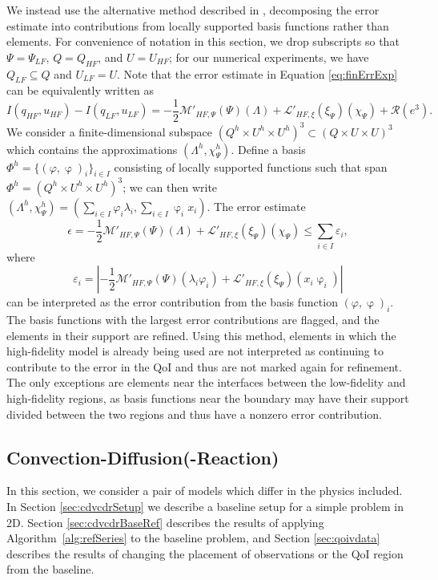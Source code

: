 We instead use the alternative method described in \cite{vanOpstaletal15}, decomposing the error estimate into contributions from locally supported basis functions rather than elements. For convenience of notation in this section, we drop subscripts so that $\Psi=\Psi_{LF}$, $Q=Q_{HF}$, and $U=U_{HF}$; for our numerical experiments, we have $Q_{LF}\subseteq Q$ and $U_{LF}=U$. Note that the error estimate in Equation \ref{eq:finErrExp} can be equivalently written as
%
\begin{equation}
I(q_{HF},u_{HF})-I(q_{LF},u_{LF})=-\frac{1}{2}\mathcal{M}'_{HF,\Psi}(\Psi)(\Lambda)+\mathcal{L}'_{HF,\xi}(\xi_\Psi)(\chi_\Psi)+\mathcal{R}(e^3). \nonumber
\end{equation}
%
We consider a finite-dimensional  subspace $(Q^h\times U^h\times U^h)^3 \subset (Q\times U\times U)^3$ which contains the approximations $(\Lambda^h,\chi_\Psi^h)$. Define a basis $\Phi^h=\{(\varphi,\upvarphi)_i\}_{i\in I}$ consisting of locally supported functions such that span $\Phi^h=(Q^h\times U^h\times U^h)^3$; we can then write $(\Lambda^h,\chi_\Psi^h)=(\sum_{i\in I}\varphi_i\lambda_i,\sum_{i\in I}\upvarphi_i x_i)$. The error estimate
%
\begin{equation}
\epsilon = -\frac{1}{2}\mathcal{M}'_{HF,\Psi}(\Psi)(\Lambda)+\mathcal{L}'_{HF,\xi}(\xi_\Psi)(\chi_\Psi) \leq \sum_{i\in I} \varepsilon_i,
\end{equation}
%
where
%
\begin{equation}\label{eq:basisblame}
\varepsilon_i = \left| -\frac{1}{2}\mathcal{M}'_{HF,\Psi}(\Psi)(\lambda_i\varphi_i)+\mathcal{L}'_{HF,\xi}(\xi_\Psi)(x_i\upvarphi_i) \right|
\end{equation}
%
can be interpreted as the error contribution from the basis function $(\varphi,\upvarphi)_i$. The basis functions with the largest error contributions are flagged, and the elements in their support are refined. Using this method, elements in which the high-fidelity model is already being used are not interpreted as continuing to contribute to the error in the QoI and thus are not marked again for refinement. The only exceptions are elements near the interfaces between the low-fidelity and high-fidelity regions, as basis functions near the boundary may have their support divided between the two regions and thus have a nonzero error contribution. 
%
\subsection{Convection-Diffusion(-Reaction)} \label{sec:cdvcdr}
%
In this section, we consider a pair of models which differ in the physics included. In Section \ref{sec:cdvcdrSetup} we describe a baseline setup for a simple problem in 2D. Section \ref{sec:cdvcdrBaseRef} describes the results of applying Algorithm~\ref{alg:refSeries} to the baseline problem, and Section \ref{sec:qoivdata} describes the results of changing the placement of observations or the QoI region from the baseline.
%
